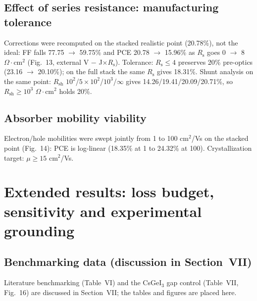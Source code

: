 \documentclass[review]{elsarticle}
\begin{document}
\subsection{Effect of series resistance: manufacturing tolerance}
Corrections were recomputed on the stacked realistic point (20.78\%), not the ideal: FF falls 77.75 $\rightarrow$ 59.75\% and PCE 20.78 $\rightarrow$ 15.96\% as $R_{\mathrm{s}}$ goes 0 $\rightarrow$ 8 $\Omega\cdot$cm$^{2}$ (Fig.~13, external V $-$ J$\times$$R_{\mathrm{s}}$). Tolerance: $R_{\mathrm{s}}\le4$ preserves 20\% pre-optics (23.16 $\rightarrow$ 20.10\%); on the full stack the same $R_{\mathrm{s}}$ gives 18.31\%. Shunt analysis on the same point: $R_{\mathrm{sh}}$ $10^{2}$/$5\times10^{2}$/$10^{3}$/$\infty$ gives 14.26/19.41/20.09/20.71\%, so $R_{\mathrm{sh}}\ge10^{3}$ $\Omega\cdot$cm$^{2}$ holds 20\%.
\subsection{Absorber mobility viability}
Electron/hole mobilities were swept jointly from 1 to 100 cm$^{2}$/Vs on the stacked point (Fig.~14): PCE is log-linear (18.35\% at 1 to 24.32\% at 100). Crystallization target: $\mu\ge15$ cm$^{2}$/Vs.


\section{Extended results: loss budget, sensitivity and experimental grounding}
\subsection{Benchmarking data (discussion in Section~VII)}
Literature benchmarking (Table~VI) and the CsGeI$_{3}$ gap control (Table~VII, Fig.~16) are discussed in Section~VII; the tables and figures are placed here.
\end{document}
